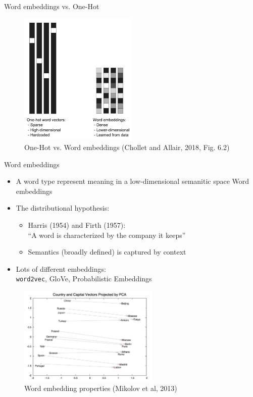 \documentclass[10pt]{beamer}
\begin{document}
\begin{frame}{Word embeddings vs. One-Hot}

\begin{figure}[h]
\centering
\includegraphics[width=0.5\textwidth]{fig/DLR_6_2_WE_VS_OH.png}
\caption{One-Hot vs. Word embeddings (Chollet and Allair, 2018, Fig. 6.2)}
\end{figure}

\end{frame}

\begin{frame}{Word embeddings}

\begin{itemize}
\item A word type represent {\color{uured} meaning in a low-dimensional semanitic space Word embeddings}
\item The distributional hypothesis:
\begin{itemize}
  \item Harris (1954) and Firth (1957): \\ ``A word is characterized by the company it keeps''
  \item Semantics (broadly defined) is captured by  {\color{uured} context}
\end{itemize}
\item Lots of different embeddings: \\ \texttt{word2vec}, GloVe, Probabilistic Embeddings
\end{itemize}

\begin{figure}[h]
\centering
\includegraphics[width=0.6\textwidth]{fig/Mikolov_2013_word_projections.png}
\caption{Word embedding properties (Mikolov et al, 2013)}
\end{figure}

\end{frame}
\end{document}
